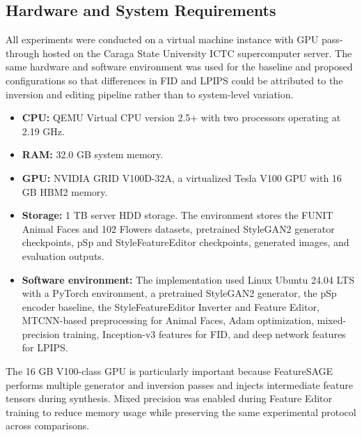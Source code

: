 \subsection{Hardware and System Requirements}
\label{sec:hardware_system_requirements}

All experiments were conducted on a virtual machine instance with GPU pass-through hosted on the Caraga State University ICTC supercomputer server. The same hardware and software environment was used for the baseline and proposed configurations so that differences in FID and LPIPS could be attributed to the inversion and editing pipeline rather than to system-level variation.

\begin{itemize}
    \item \textbf{CPU:} QEMU Virtual CPU version 2.5+ with two processors operating at 2.19 GHz.
    \item \textbf{RAM:} 32.0 GB system memory.
    \item \textbf{GPU:} NVIDIA GRID V100D-32A, a virtualized Tesla V100 GPU with 16 GB HBM2 memory.
    \item \textbf{Storage:} 1 TB server HDD storage. The environment stores the FUNIT Animal Faces and 102 Flowers datasets, pretrained StyleGAN2 generator checkpoints, pSp and StyleFeatureEditor checkpoints, generated images, and evaluation outputs.
    \item \textbf{Software environment:} The implementation used Linux Ubuntu 24.04 LTS with a PyTorch environment, a pretrained StyleGAN2 generator, the pSp encoder baseline, the StyleFeatureEditor Inverter and Feature Editor, MTCNN-based preprocessing for Animal Faces, Adam optimization, mixed-precision training, Inception-v3 features for FID, and deep network features for LPIPS.
\end{itemize}

The 16 GB V100-class GPU is particularly important because FeatureSAGE performs multiple generator and inversion passes and injects intermediate feature tensors during synthesis. Mixed precision was enabled during Feature Editor training to reduce memory usage while preserving the same experimental protocol across comparisons.
